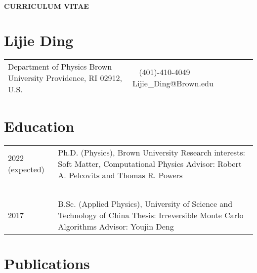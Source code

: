 \documentclass[11pt,letterpaper]{article}
\begin{document}
\pagestyle{headings}
\begin{center}
    \Large{\textbf{CURRICULUM VITAE}}
\end{center}
\section*{Lijie Ding}
\vspace*{-0.15in}
\begin{longtable}{p{0.5\linewidth} p{0.5\linewidth}}
    Department of Physics \newline
    Brown University \newline
    Providence, RI 02912, U.S.
     & ~\newline
    (401)-410-4049 \newline
    Lijie\_Ding@Brown.edu
\end{longtable}

\section*{Education}
\vspace*{-0.15in}
\begin{longtable}{l p{\linewidth}}
    2022 (expected) & Ph.D. (Physics), Brown University \newline
    Research interests: Soft Matter, Computational Physics \newline
    Advisor: Robert A. Pelcovits and Thomas R. Powers                                                 \\~\\
    2017            & B.Sc. (Applied Physics), University of Science and Technology of China \newline
    Thesis: Irreversible Monte Carlo Algorithms \newline
    Advisor: Youjin Deng
\end{longtable}

\section*{Publications}

\begin{etaremune}
    \item {}
    \item {}
    \item {}
    \item {}
\end{etaremune}
\end{document}

